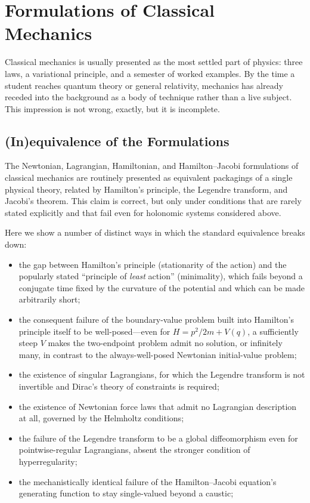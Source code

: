 \chapter{Formulations of Classical Mechanics}
\label{fm}

Classical mechanics is usually presented as the most settled part of
physics: three laws, a variational principle, and a semester of
worked examples. By the time a student reaches quantum theory or
general relativity, mechanics has already receded into the
background as a body of technique rather than a live subject. This
impression is not wrong, exactly, but it is incomplete. 

\section {(In)equivalence of the Formulations} 
\label{fm:nf}

The Newtonian, Lagrangian, Hamiltonian, and Hamilton--Jacobi formulations of
classical mechanics are routinely presented as equivalent packagings of a
single physical theory, related by Hamilton's principle, the Legendre
transform, and Jacobi's theorem. This claim is correct, but only under
conditions that are rarely stated explicitly and that fail even for
holonomic systems considered above.

Here we show a number  of
 distinct ways in which the standard equivalence breaks down: 
\begin{itemize}
   \item the gap
between Hamilton's principle (stationarity of the action) and the popularly
stated ``principle of \emph{least} action'' (minimality), which fails beyond a
conjugate time fixed by the curvature of the potential and which can be made
arbitrarily short;
   \item the consequent failure of the boundary-value problem built
into Hamilton's principle itself to be well-posed---even for $H=p^2/2m+V(q)$, a
sufficiently steep $V$ makes the two-endpoint problem admit no solution, or
infinitely many, in contrast to the always-well-posed Newtonian initial-value
problem;
   \item the existence of singular Lagrangians, for which the Legendre
transform is not invertible and Dirac's theory of constraints is required;
   \item the existence of Newtonian force laws that admit no
Lagrangian description at all, governed by the Helmholtz conditions;
   \item the
failure of the Legendre transform to be a global diffeomorphism even for
pointwise-regular Lagrangians, absent the stronger condition of
hyperregularity;
   \item the mechanistically identical failure of the Hamilton--Jacobi
equation's generating function to stay single-valued beyond a caustic;
\end{itemize}

